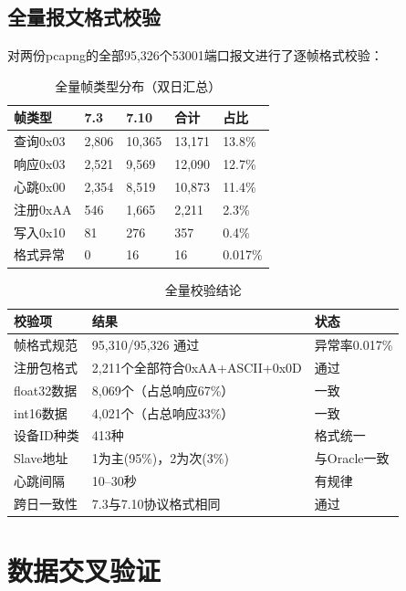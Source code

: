 \documentclass[12pt,a4paper]{ctexart}
\begin{document}
\subsection{全量报文格式校验}

对两份pcapng的全部95,326个53001端口报文进行了逐帧格式校验：

\begin{table}[H]\centering
\caption{全量帧类型分布（双日汇总）}
\begin{tabular}{p{3.5cm}p{2cm}p{2cm}p{2cm}p{2cm}}
\toprule
\textbf{帧类型} & \textbf{7.3} & \textbf{7.10} & \textbf{合计} & \textbf{占比} \\
\midrule
查询0x03 & 2,806 & 10,365 & 13,171 & 13.8\% \\
响应0x03 & 2,521 & 9,569 & 12,090 & 12.7\% \\
心跳0x00 & 2,354 & 8,519 & 10,873 & 11.4\% \\
注册0xAA & 546 & 1,665 & 2,211 & 2.3\% \\
写入0x10 & 81 & 276 & 357 & 0.4\% \\
\midrule
格式异常 & 0 & 16 & 16 & 0.017\% \\
\bottomrule
\end{tabular}
\end{table}

\begin{table}[H]\centering
\caption{全量校验结论}
\begin{tabular}{p{4cm}p{5cm}p{3cm}}
\toprule
\textbf{校验项} & \textbf{结果} & \textbf{状态} \\
\midrule
帧格式规范 & 95,310/95,326 通过 & 异常率0.017\% \\
注册包格式 & 2,211个全部符合0xAA+ASCII+0x0D & 通过 \\
float32数据 & 8,069个（占总响应67\%） & 一致 \\
int16数据 & 4,021个（占总响应33\%） & 一致 \\
设备ID种类 & 413种 & 格式统一 \\
Slave地址 & 1为主(95\%)，2为次(3\%) & 与Oracle一致 \\
心跳间隔 & 10--30秒 & 有规律 \\
跨日一致性 & 7.3与7.10协议格式相同 & 通过 \\
\bottomrule
\end{tabular}
\end{table}

\section{数据交叉验证}
\end{document}
